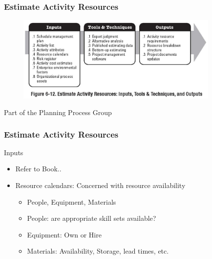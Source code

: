 \begin{frame}
\frametitle{Estimate Activity Resources}
\begin{figure}
	\centering
		\includegraphics[width = 10cm]{images/Fig6-12.jpg}
	\label{fig:6-12}
\end{figure}
Part of the Planning Process Group
\end{frame}




\begin{frame}
\frametitle{Estimate Activity Resources}
Inputs
\begin{itemize}
	\item Refer to Book..
	\item Resource calendars: Concerned with resource availability
\begin{itemize}
	\item People, Equipment, Materials
	\item People: are appropriate skill sets available?
	\item Equipment: Own or Hire
	\item Materials: Availability, Storage, lead times, etc.
\end{itemize}
\end{itemize}
\end{frame}




